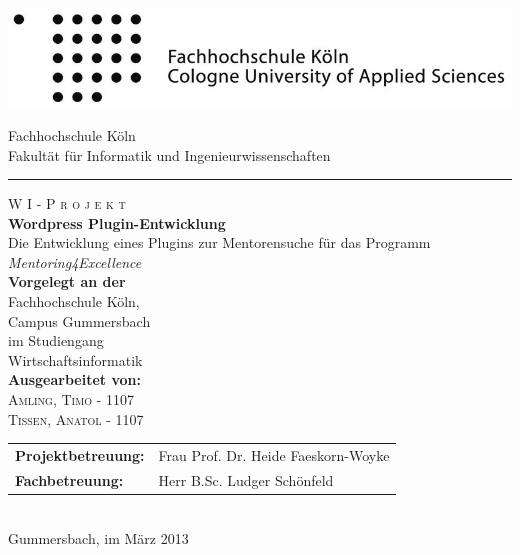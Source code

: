 \begin{titlepage}
\includegraphics[scale=1.0]{pictures/logoheader.jpg}\\
\begin{center}
\Large
Fachhochschule Köln\\
Fakultät für Informatik und Ingenieurwissenschaften
\hrule\par\rule{0pt}{2cm} 
\LARGE
\textsc{W I - P r o j e k t}\\
\vspace{1cm}
\huge
{\bf Wordpress Plugin-Entwicklung}\\
\Large
Die Entwicklung eines Plugins zur Mentorensuche für das Programm {\it Mentoring4Excellence}\\
\vspace{1.0cm}
\large
{\bf Vorgelegt an der} \\
Fachhochschule Köln, \\
Campus Gummersbach\\
im Studiengang\\
Wirtschaftsinformatik\\
\vspace{1.0cm}
\textbf{Ausgearbeitet von:}\\
\textsc{Amling, Timo - 1107\\
Tissen, Anatol - 1107\\}
\vspace{2.0cm}
\begin{tabular}{ll}
 \textbf{Projektbetreuung:} & Frau Prof. Dr. Heide Faeskorn-Woyke \\
 \textbf{Fachbetreuung:} & Herr B.Sc. Ludger Schönfeld\\
 \end{tabular}
 \vspace{1.5cm}
 \\Gummersbach, im März 2013
\end{center}

\end{titlepage}